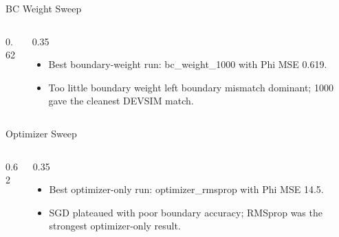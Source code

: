 \documentclass[aspectratio=169,professionalfonts]{beamer}
\begin{document}
\begin{frame}[t]{BC Weight Sweep}
\begin{columns}[T,onlytextwidth]
\begin{column}{0.62\textwidth}
\scriptsize
{}
\end{column}
\begin{column}{0.35\textwidth}
\begin{itemize}
  \item Best boundary-weight run: bc\_weight\_1000 with Phi MSE 0.619.
  \item Too little boundary weight left boundary mismatch dominant; 1000 gave the cleanest DEVSIM match.
\end{itemize}
\end{column}
\end{columns}
\end{frame}

\begin{frame}[t]{Optimizer Sweep}
\begin{columns}[T,onlytextwidth]
\begin{column}{0.62\textwidth}
\scriptsize
{}
\end{column}
\begin{column}{0.35\textwidth}
\begin{itemize}
  \item Best optimizer-only run: optimizer\_rmsprop with Phi MSE 14.5.
  \item SGD plateaued with poor boundary accuracy; RMSprop was the strongest optimizer-only result.
\end{itemize}
\end{column}
\end{columns}
\end{frame}
\end{document}
